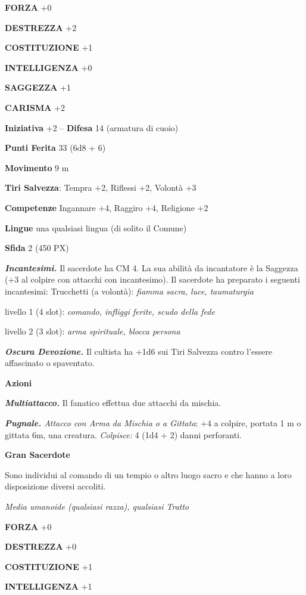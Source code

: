 \begin{multicols}{2}
	\textbf{FORZA} +0

	\textbf{DESTREZZA} +2

	\textbf{COSTITUZIONE} +1

	\textbf{INTELLIGENZA} +0

	\textbf{SAGGEZZA} +1

	\textbf{CARISMA} +2

	\textbf{Iniziativa} +2 -- \textbf{Difesa} 14 (armatura di cuoio)

	\textbf{Punti Ferita} 33 (6d8 + 6)

	\textbf{Movimento} 9 m

	\textbf{Tiri Salvezza}: Tempra +2, Riflessi +2, Volontà +3

	\textbf{Competenze} Ingannare +4, Raggiro +4, Religione +2

	\textbf{Lingue} una qualsiasi lingua (di solito il Comune)

	\textbf{Sfida} 2 (450 PX)

	\textit{\textbf{Incantesimi.}} Il sacerdote ha CM 4. La sua abilità da incantatore è la Saggezza (+3 al colpire con attacchi con incantesimo). Il sacerdote ha preparato i seguenti incantesimi: Trucchetti (a volontà): \textit{fiamma sacra, luce, taumaturgia}

	livello 1 (4 slot): \textit{comando, infliggi ferite, scudo della fede}

	livello 2 (3 slot): \textit{arma spirituale, blocca persona}

	\textit{\textbf{Oscura Devozione.}} Il cultista ha +1d6 sui Tiri Salvezza contro l'essere affascinato o spaventato.

	\textbf{Azioni}

	\textit{\textbf{Multiattacco.}} Il fanatico effettua due attacchi da mischia.

	\textit{\textbf{Pugnale.} Attacco con Arma da Mischia o a Gittata}: +4 a colpire, portata 1 m o gittata 6m, una creatura. \textit{Colpisce:} 4 (1d4 + 2) danni perforanti.

	\medskip\textbf{Gran Sacerdote}

	Sono individui al comando di un tempio o altro luogo sacro e che hanno a loro disposizione diversi accoliti.

	\textit{Media umanoide (qualsiasi razza), qualsiasi Tratto}

	\textbf{FORZA} +0

	\textbf{DESTREZZA} +0

	\textbf{COSTITUZIONE} +1

	\textbf{INTELLIGENZA} +1


\end{multicols}

